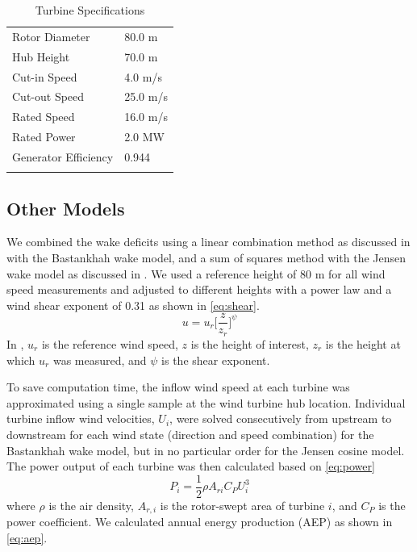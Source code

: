 \documentclass{jpconf}
\begin{document}
%
\begin{table}[h!]
	\caption{Turbine Specifications}
	\label{tab:v80}
	\centering
	\begin{tabular}{l l}
		\br
		Rotor Diameter & 80.0 m\\
		Hub Height & 70.0 m \\
		Cut-in Speed & 4.0 m/s\\
		Cut-out Speed & 25.0 m/s \\
		Rated Speed & 16.0 m/s \\
		Rated Power & 2.0 MW \\
		Generator Efficiency & 0.944 \\
		\br
	\end{tabular}
\end{table}

\subsection{Other Models}
We combined the wake deficits using a linear combination method as discussed in \cite{niayifar2016} with the Bastankhah wake model, and a sum of squares method with the Jensen wake model as discussed in \cite{katic1986}. We used a reference height of 80 m for all wind speed measurements and adjusted to different heights with a power law and a wind shear exponent of 0.31 as shown in \cref{eq:shear}. 
%
\begin{equation} \label{eq:shear}
u = u_r\bigg[\frac{z}{z_r}\bigg]^\psi
\end{equation}
%
In , $u_r$ is the reference wind speed, $z$ is the height of interest, $z_r$ is the height at which $u_r$ was measured, and $\psi$ is the shear exponent.

To save computation time, the inflow wind speed at each turbine was approximated using a single sample at the wind turbine hub location. Individual turbine inflow wind velocities, $U_i$, were solved consecutively from upstream to downstream for each wind state (direction and speed combination) for the Bastankhah wake model, but in no particular order for the Jensen cosine model. The power output of each turbine was then calculated based on \cref{eq:power}
%
\begin{equation}\label{eq:power}
P_i = \frac{1}{2}\rho A_{ri}C_P U_i^3
\end{equation}
%
where $\rho$ is the air density, $A_{r,i}$ is the rotor-swept area of turbine $i$, and $C_P$ is the power coefficient. We calculated annual energy production (AEP) as shown in \cref{eq:aep}.
\end{document}
